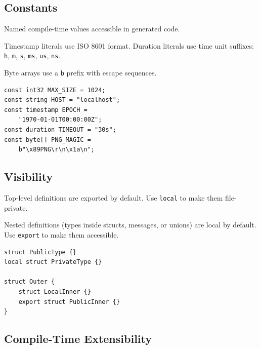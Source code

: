 \documentclass[11pt,onecolumn]{article}
\begin{document}
\begin{minipage}{\textwidth}
\subsection{Constants}

\begin{minipage}[t]{0.48\textwidth}
Named compile-time values accessible in generated code.

Timestamp literals use ISO 8601 format. Duration literals use time unit suffixes: \texttt{h}, \texttt{m}, \texttt{s}, \texttt{ms}, \texttt{us}, \texttt{ns}.

Byte arrays use a \texttt{b} prefix with escape sequences.
\end{minipage}\hfill
\begin{minipage}[t]{0.48\textwidth}
\begin{lstlisting}[language=bebop,aboveskip=0pt,belowskip=0pt]
const int32 MAX_SIZE = 1024;
const string HOST = "localhost";
const timestamp EPOCH =
    "1970-01-01T00:00:00Z";
const duration TIMEOUT = "30s";
const byte[] PNG_MAGIC =
    b"\x89PNG\r\n\x1a\n";
\end{lstlisting}
\end{minipage}

\vspace{12pt}
\subsection{Visibility}

\begin{minipage}[t]{0.52\textwidth}
\raggedright
Top-level definitions are exported by default. Use \texttt{local} to make them file-private.

Nested definitions (types inside structs, messages, or unions) are local by default. Use \texttt{export} to make them accessible.
\end{minipage}\hfill
\begin{minipage}[t]{0.44\textwidth}
\begin{lstlisting}[language=bebop,aboveskip=0pt,belowskip=0pt]
struct PublicType {}
local struct PrivateType {}

struct Outer {
    struct LocalInner {}
    export struct PublicInner {}
}
\end{lstlisting}
\end{minipage}
\end{minipage}

\subsection{Compile-Time Extensibility}
\end{document}
